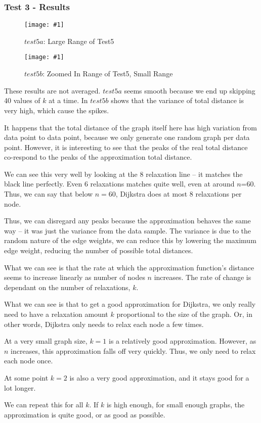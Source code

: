\documentclass{article}
\newcommand{\figureInsetScaled}[3]
{
    \FloatBarrier{}
    \begin{figure}[ht!]
        \centering
        \texttt{[image: \#1]}
        \caption{#2}
    \end{figure}
    \FloatBarrier{}
}
\begin{document}
\newpage
\subsubsection{Test 3 - Results}

\figureInsetScaled{images/part1/exp1_5a.png}{$test5a$: Large Range of Test5}{0.5}
\figureInsetScaled{images/part1/exp1_5b.png}{$test5b$: Zoomed In Range of Test5, Small Range}{0.5}

These results are not averaged. $test5a$ seems smooth because we end up skipping 40 values of $k$ at a time. In $test5b$ shows that the variance of total distance is very high, which cause the spikes.

It happens that the total distance of the graph itself here has high variation from data point to data point, because we only generate one random graph per data point. However, it is interesting to see that the peaks of the real total distance co-respond to the peaks of the approximation total distance.

We can see this very well by looking at the 8 relaxation line -- it matches the black line perfectly. Even 6 relaxations matches quite well, even at around $n$=60. Thus, we can say that below $n=60$, Dijkstra does at most 8 relaxations per node.

Thus, we can disregard any peaks because the approximation behaves the same way -- it was just the variance from the data sample. The variance is due to the random nature of the edge weights, we can reduce this by lowering the maximum edge weight, reducing the number of possible total distances.

What we can see is that the rate at which the approximation function's distance seems to increase linearly as number of nodes $n$ increases. The rate of change is dependant on the number of relaxations, $k$.

What we can see is that to get a good approximation for Dijkstra, we only really need to have a relaxation amount $k$ proportional to the size of the graph. Or, in other words, Dijkstra only needs to relax each node a few times.

At a very small graph size, $k=1$ is a relatively good approximation. However, as $n$ increases, this approximation falls off very quickly. Thus, we only need to relax each node once.

At some point $k=2$ is also a very good approximation, and it stays good for a lot longer.

We can repeat this for all $k$. If $k$ is high enough, for small enough graphs, the approximation is quite good, or as good as possible.
\end{document}
